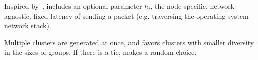 



Inspired by~\cite{Dabek:2004:VDN:1030194.1015471}, \marcopolo includes an optional parameter $h_i$, the node-specific, network-agnostic, fixed latency of sending a packet (e.g. traversing the operating system network stack). 

Multiple clusters are generated at once, and \marcopolo favors clusters with smaller diversity in the sizes of groups. If there is a tie, \marcopolo makes a random choice.





